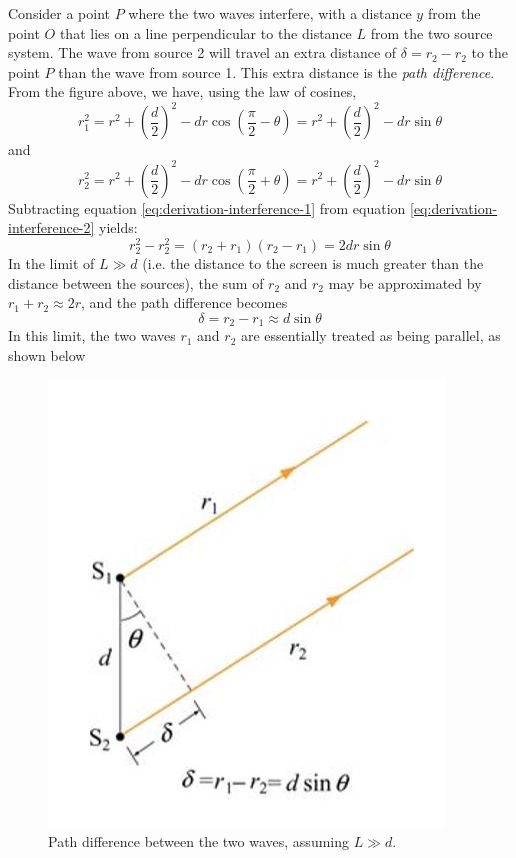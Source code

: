 Consider a point $P$ where the two waves interfere, with a distance $y$ from the point $O$ that lies on a line perpendicular to the distance $L$ from the two source system. The wave from source 2 will travel an extra distance of $\delta = r_2 - r_2$ to the point $P$ than the wave from source 1. This extra distance is the \textit{path difference}. From the figure above, we have, using the law of cosines, 
\begin{equation}
    \label{eq:derivation-interference-1}
    r_1^2 = r^2 + \left(\frac{d}{2}\right)^2 - dr\cos \left(\frac{\pi}{2} - \theta\right) = r^2 + \left(\frac{d}{2}\right)^2 -dr \sin \theta
\end{equation}
and
\begin{equation}
    \label{eq:derivation-interference-2}
    r_2^2 = r^2 + \left(\frac{d}{2}\right)^2 - dr\cos \left(\frac{\pi}{2} + \theta\right) = r^2 + \left(\frac{d}{2}\right)^2 -dr \sin \theta
\end{equation}
Subtracting equation \ref{eq:derivation-interference-1} from equation \ref{eq:derivation-interference-2} yields:
\begin{equation*}
    r_2^2 - r_2^2 = (r_2 + r_1)(r_2 - r_1) = 2dr \sin \theta 
\end{equation*}
In the limit of $L \gg d$ (i.e. the distance to the screen is much greater than the distance between the sources), the sum of $r_2$ and $r_2$ may be approximated by $r_1 + r_2 \approx 2r$, and the path difference becomes
\begin{equation*}
    \delta = r_2 - r_1 \approx d \sin \theta 
\end{equation*}
In this limit, the two waves $r_1$ and $r_2$ are essentially treated as being parallel, as shown below

\begin{figure}[h!]
    \centering
    \includegraphics[scale=0.5]{notes/images/Interference-Two-Source-3.JPG}
    \caption{Path difference between the two waves, assuming $L \gg d$.}
\end{figure}
\FloatBarrier

